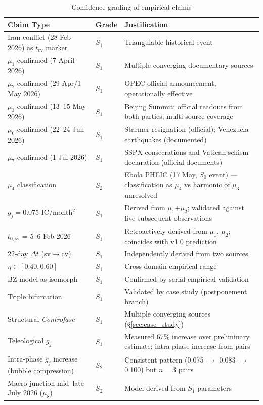 \documentclass[12pt,a4paper]{article}
\newcommand{\gj}{g_j}
\begin{document}
\begin{table}[H]
\centering
\caption{Confidence grading of empirical claims}
\label{tab:svp_grading}
\begin{tabularx}{\textwidth}{@{}p{4.2cm}lX@{}}
\toprule
\textbf{Claim Type} & \textbf{Grade} & \textbf{Justification} \\
\midrule
Iran conflict (28 Feb 2026) as $t_{\mathrm{cv}}$ marker & $S_1$ & Triangulable historical event \\
$\mu_1$ confirmed (7 April 2026) & $S_1$ & Multiple converging documentary sources \\
$\mu_2$ confirmed (29 Apr/1 May 2026) & $S_1$ & OPEC official announcement, operationally effective \\
$\mu_3$ confirmed (13--15 May 2026) & $S_1$ & Beijing Summit; official readouts from both parties; multi-source coverage \\
$\mu_6$ confirmed (22--24 Jun 2026) & $S_1$ & Starmer resignation (official); Venezuela earthquakes (documented) \\
$\mu_7$ confirmed (1 Jul 2026) & $S_1$ & SSPX consecrations and Vatican schism declaration (official documents) \\
$\mu_4$ classification & $S_2$ & Ebola PHEIC (17 May, $S_0$ event) --- classification as $\mu_4$ vs harmonic of $\mu_3$ unresolved \\
$\gj = 0.075$ IC/month$^2$ & $S_1$ & Derived from $\mu_1$+$\mu_2$; validated against five subsequent observations \\
$t_{0,\mathrm{sv}}$ = 5--6 Feb 2026 & $S_1$ & Retroactively derived from $\mu_1$, $\mu_2$; coincides with v1.0 prediction \\
22-day $\Delta t$ (sv$\to$cv) & $S_1$ & Independently derived from two sources \\
$\eta \in [0.40, 0.60]$ & $S_1$ & Cross-domain empirical range \\
BZ model as isomorph & $S_1$ & Confirmed by serial empirical validation \\
Triple bifurcation & $S_1$ & Validated by case study (postponement branch) \\
Structural \textit{Controfase} & $S_1$ & Multiple converging sources (\S\ref{sec:case_study}) \\
Teleological $\gj$ & $S_1$ & Measured 67\% increase over preliminary estimate; intra-phase increase from pairs \\
Intra-phase $\gj$ increase (bubble compression) & $S_2$ & Consistent pattern (0.075 $\to$ 0.083 $\to$ 0.100) but $n=3$ pairs \\
Macro-junction mid--late July 2026 ($\mu_8$) & $S_2$ & Model-derived from $S_1$ parameters \\
\bottomrule
\end{tabularx}
\end{table}
\end{document}
